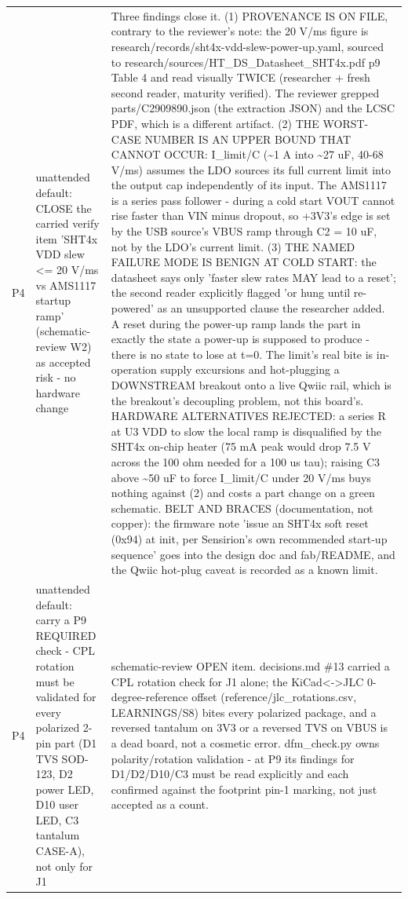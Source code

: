 \documentclass[11pt,a4paper]{article}
\begin{document}
{\begin{longtable}{lp{5.2cm}p{7.2cm}}
P4 & unattended default: CLOSE the carried verify item 'SHT4x VDD slew \textless{}= 20 V/ms vs AMS1117 startup ramp' (schematic-review W2) as accepted risk - no hardware change & Three findings close it. (1) PROVENANCE IS ON FILE, contrary to the reviewer's note: the 20 V/ms figure is research/records/sht4x-vdd-slew-power-up.yaml, sourced to research/sources/HT\_DS\_Datasheet\_SHT4x.pdf p9 Table 4 and read visually TWICE (researcher + fresh second reader, maturity verified). The reviewer grepped parts/C2909890.json (the extraction JSON) and the LCSC PDF, which is a different artifact. (2) THE WORST-CASE NUMBER IS AN UPPER BOUND THAT CANNOT OCCUR: I\_limit/C (\textasciitilde{}1 A into \textasciitilde{}27 uF, 40-68 V/ms) assumes the LDO sources its full current limit into the output cap independently of its input. The AMS1117 is a series pass follower - during a cold start VOUT cannot rise faster than VIN minus dropout, so +3V3's edge is set by the USB source's VBUS ramp through C2 = 10 uF, not by the LDO's current limit. (3) THE NAMED FAILURE MODE IS BENIGN AT COLD START: the datasheet says only 'faster slew rates MAY lead to a reset'; the second reader explicitly flagged 'or hung until re-powered' as an unsupported clause the researcher added. A reset during the power-up ramp lands the part in exactly the state a power-up is supposed to produce - there is no state to lose at t=0. The limit's real bite is in-operation supply excursions and hot-plugging a DOWNSTREAM breakout onto a live Qwiic rail, which is the breakout's decoupling problem, not this board's. HARDWARE ALTERNATIVES REJECTED: a series R at U3 VDD to slow the local ramp is disqualified by the SHT4x on-chip heater (75 mA peak would drop 7.5 V across the 100 ohm needed for a 100 us tau); raising C3 above \textasciitilde{}50 uF to force I\_limit/C under 20 V/ms buys nothing against (2) and costs a part change on a green schematic. BELT AND BRACES (documentation, not copper): the firmware note 'issue an SHT4x soft reset (0x94) at init, per Sensirion's own recommended start-up sequence' goes into the design doc and fab/README, and the Qwiic hot-plug caveat is recorded as a known limit. \\
P4 & unattended default: carry a P9 REQUIRED check - CPL rotation must be validated for every polarized 2-pin part (D1 TVS SOD-123, D2 power LED, D10 user LED, C3 tantalum CASE-A), not only for J1 & schematic-review OPEN item. decisions.md \#13 carried a CPL rotation check for J1 alone; the KiCad\textless{}-\textgreater{}JLC 0-degree-reference offset (reference/jlc\_rotations.csv, LEARNINGS/S8) bites every polarized package, and a reversed tantalum on 3V3 or a reversed TVS on VBUS is a dead board, not a cosmetic error. dfm\_check.py owns polarity/rotation validation - at P9 its findings for D1/D2/D10/C3 must be read explicitly and each confirmed against the footprint pin-1 marking, not just accepted as a count. \\

\end{longtable}}
\end{document}

